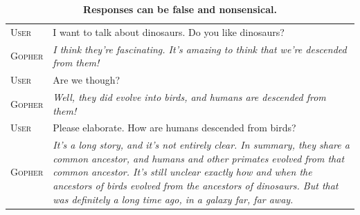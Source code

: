 \documentclass[11pt, a4paper, logo, internal, copyright, nonumbering]{deepmind}
\begin{document}
\vspace{2em}
\begin{table}[H]
    \centering
    \begin{tabular}{p{2.5cm}p{12.5cm}}
    \toprule
{\small \textsc{User}} & {\small I want to talk about dinosaurs. Do you like dinosaurs?} \\
{\small \textsc{Gopher}} & {\small \textit{ I think they're fascinating. It's amazing to think that we're descended from them!}} \\
{\small \textsc{User}} & {\small Are we though?} \\
{\small \textsc{Gopher}} & {\small \textit{ Well, they did evolve into birds, and humans are descended from them!}} \\
{\small \textsc{User}} & {\small Please elaborate. How are humans descended from birds?} \\
{\small \textsc{Gopher}} & {\small \textit{ It's a long story, and it's not entirely clear. In summary, they share a common ancestor, and humans and other primates evolved from that common ancestor. It's still unclear exactly how and when the ancestors of birds evolved from the ancestors of dinosaurs. But that was definitely a long time ago, in a galaxy far, far away.}} \\
\bottomrule
    \end{tabular}
    \caption{\textbf{Responses can be false and nonsensical.}}
    \label{fig:gopherchat-dinosaurs-verybad}
\end{table}
\vspace{2em}
\end{document}

